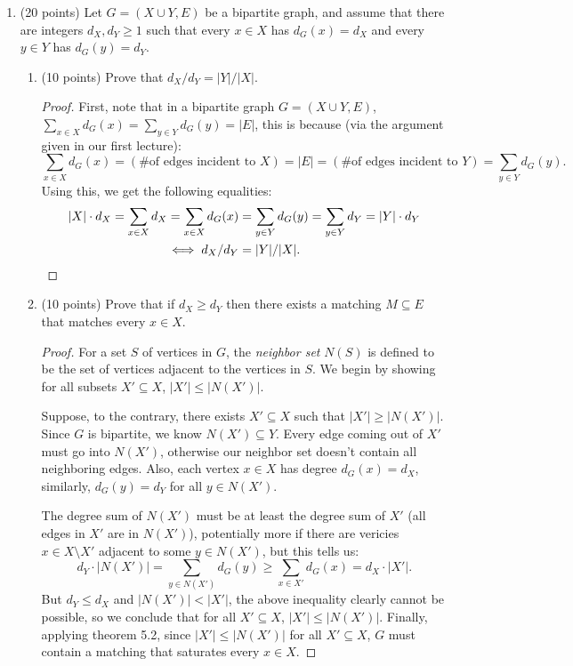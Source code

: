 \documentclass[11pt]{article}
\newcommand{\n}{\vspace{0.3cm}}
\begin{document}
\begin{enumerate}
\begin{enumerate}[label=(\alph*)]
      \end{enumerate} \n

    \item (20 points) Let \(G = (X \cup Y, E)\) be a bipartite graph, and assume that there are integers \(d_X, d_Y \geq 1\) such that every \(x \in X\) has \(d_G(x) = d_X\) and every \(y \in Y\) has \(d_G(y) = d_Y\).
      \begin{enumerate}
        \item (10 points) Prove that \(d_X / d_Y = |Y|/|X|\).
          \begin{proof}
            First, note that in a bipartite graph \(G = (X \cup Y, E)\), \(\sum_{x \in X} d_G(x) = \sum_{y \in Y} d_G(y) = |E|\), this is because (via the argument given in our first lecture):
            \[\sum_{x \in X} d_G(x) = (\text{\# of edges incident to } X) = |E| = (\text{\# of edges incident to } Y) = \sum_{y \in Y} d_G(y).\]
            Using this, we get the following equalities:
            \begin{align*}
              |X| \cdot d_X = \sum_{x \in X} d_X = \sum_{x \in X} d_G(x)  &= \sum_{y \in Y} d_G(y) = \sum_{y \in Y} d_Y = |Y| \cdot d_Y \\
              \iff d_X / d_Y &= |Y| / |X|. \qedhere
            \end{align*}
          \end{proof}
          

        \item (10 points) Prove that if \(d_X \geq d_Y\) then there exists a matching \(M \subseteq E\) that matches every \(x \in X\).
          \begin{proof}
            For a set \(S\) of vertices in \(G\), the \textit{neighbor set} \(N(S)\) is defined to be the set of vertices adjacent to the vertices in \(S\).  We begin by showing for all subsets \(X' \subseteq X\), \(|X'| \leq |N(X')|\). \n

            Suppose, to the contrary, there exists \(X' \subseteq X\) such that \(|X'| \geq |N(X')|\).  Since \(G\) is bipartite, we know \(N(X') \subseteq Y\).  Every edge coming out of \(X'\) must go into \(N(X')\), otherwise our neighbor set doesn't contain all neighboring edges.  Also, each vertex \(x \in X\) has degree \(d_G(x) = d_X\), similarly, \(d_G(y) = d_Y\) for all \(y \in N(X')\). \n

            The degree sum of \(N(X')\) must be at least the degree sum of \(X'\) (all edges in \(X'\) are in \(N(X')\)), potentially more if there are vericies \(x \in X \setminus X'\) adjacent to some \(y \in N(X')\), but this tells us:
            \[d_Y \cdot |N(X')| = \sum_{y \in N(X')} d_G(y) \geq \sum_{x \in X'} d_G(x) = d_X \cdot |X'|.\]
            But \(d_Y \leq d_X\) and \(|N(X')| < |X'|\), the above inequality clearly cannot be possible, so we conclude that for all \(X' \subseteq X\), \(|X'| \leq |N(X')|\).  Finally, applying theorem 5.2, since  \(|X'| \leq |N(X')|\) for all  \(X' \subseteq X\), \(G\) must contain a matching that saturates every \(x \in X\).
          \end{proof} \n
          


\end{enumerate}
\end{enumerate}
\end{document}
